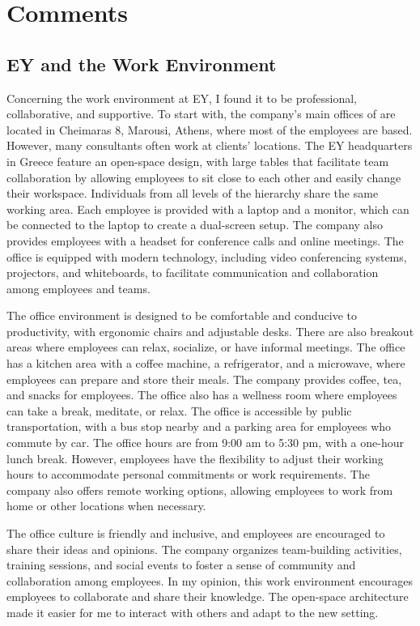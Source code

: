 \chapter{Comments}
\label{ch:comments}

\section{EY and the Work Environment}

Concerning the work environment at EY, I found it to be professional,
collaborative, and supportive. To start with, the company's main offices of are
located in Cheimaras 8, Marousi, Athens, where most of the employees are based.
However, many consultants often work at clients' locations. The EY headquarters
in Greece feature an open-space design, with large tables that facilitate team
collaboration by allowing employees to sit close to each other and easily
change their workspace. Individuals from all levels of the hierarchy share the
same working area. Each employee is provided with a laptop and a monitor, which
can be connected to the laptop to create a dual-screen setup. The company also
provides employees with a headset for conference calls and online meetings. The
office is equipped with modern technology, including video conferencing
systems, projectors, and whiteboards, to facilitate communication and
collaboration among employees and teams.

The office environment is designed to be comfortable and conducive to
productivity, with ergonomic chairs and adjustable desks. There are also
breakout areas where employees can relax, socialize, or have informal meetings.
The office has a kitchen area with a coffee machine, a refrigerator, and a
microwave, where employees can prepare and store their meals. The company
provides coffee, tea, and snacks for employees. The office also has a wellness
room where employees can take a break, meditate, or relax. The office is
accessible by public transportation, with a bus stop nearby and a parking area
for employees who commute by car. The office hours are from 9:00 am to 5:30 pm,
with a one-hour lunch break. However, employees have the flexibility to adjust
their working hours to accommodate personal commitments or work requirements.
The company also offers remote working options, allowing employees to work from
home or other locations when necessary.

The office culture is friendly and inclusive, and employees are encouraged to
share their ideas and opinions. The company organizes team-building activities,
training sessions, and social events to foster a sense of community and
collaboration among employees. In my opinion, this work environment encourages
employees to collaborate and share their knowledge. The open-space architecture
made it easier for me to interact with others and adapt to the new setting.

